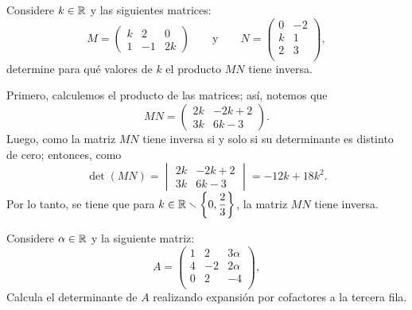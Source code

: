 \documentclass[11pt,respuestas,a4]{aleph-examen}
\begin{document}
\begin{preguntas}
\item
    Considere $k\in \mathbb{R}$ y las siguientes matrices:
    \[
    	M=\begin{pmatrix}
    	  	k & 2 & 0\\ 1 & -1 & 2k
    	  	\end{pmatrix}
    	\qquad\text{y}\qquad
    	N=\begin{pmatrix}
    	  	0 & -2\\
                k & 1\\
                2 & 3\\
    	  \end{pmatrix},
    \]
    determine para qué valores de $k$ el producto $MN$ tiene inversa.

\begin{respuesta}
    Primero, calculemos el producto de las matrices; así, notemos que 
    \[
        MN = \begin{pmatrix}
            2k & -2k+2 \\
            3k & 6k-3
        \end{pmatrix}.
    \]
    Luego, como la matriz $MN$ tiene inversa si y solo si su determinante es distinto de cero; entonces, como 
    \[
        \det(MN) = \begin{vmatrix}
            2k & -2k+2 \\
            3k & 6k-3
        \end{vmatrix} = -12k+18k^2.
    \]
    Por lo tanto, se tiene que para $k\in\mathbb{R}\smallsetminus\left\{0,\dfrac{2}{3}\right\}$, la matriz $MN$ tiene inversa. 
\end{respuesta}

\item
    Considere $\alpha\in \mathbb{R}$ y la siguiente matriz:
    \[
    	A=\begin{pmatrix}
    	  1 & 2 & 3\alpha \\
            4 & -2 & 2\alpha \\
            0 & 2 & -4 \\
    	\end{pmatrix},
    \]
    Calcula el determinante de $A$ realizando expansión por cofactores a la tercera fila.


\end{preguntas}
\end{document}
